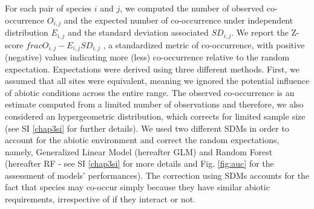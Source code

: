 For each pair of species \(i\) and \(j\), we computed the number of
observed co-occurrence \(O_{i,j}\) and the expected number of
co-occurrence under independent distribution \(E_{i,j}\) and the
standard deviation associated \(SD_{i,j}\). We report the Z-score
\(frac{O_{i,j}-E_{i,j}}{SD_{i,j}}\) \citep{Gilpin1982}, a standardized
metric of co-occurrence, with positive (negative) values indicating more
(less) co-occurrence relative to the random expectation. Expectations
were derived using three different methods. First, we assumed that all
sites were equivalent, meaning we ignored the potential influence of
abiotic conditions across the entire range. The observed co-occurrence
is an estimate computed from a limited number of observations
\citep{Gilpin1982, Veech2013} and therefore, we also considered an
hypergeometric distribution, which corrects for limited sample size (see
SI \ref{chap3si} for further details). We used two different SDMs in
order to account for the abiotic environment and correct the random
expectations, namely, Generalized Linear Model (hereafter GLM) and
Random Forest (hereafter RF - see SI \ref{chap3si} for more details and
Fig. \ref{fig:auc} for the assessment of models' performances). The
correction using SDMs accounts for the fact that species may co-occur
simply because they have similar abiotic requirements, irrespective of
if they interact or not.


